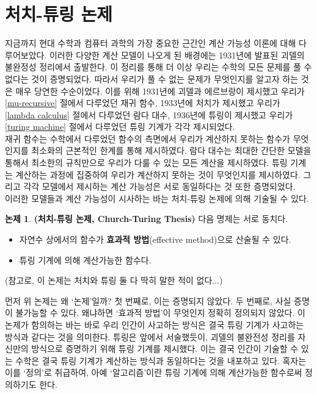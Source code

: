 \documentclass[b5paper, 10pt]{book}
\theoremstyle{definition}
\newtheorem{thesis}[defn]{논제}
\begin{document}
\section{처치-튜링 논제}
지금까지 현대 수학과 컴퓨터 과학의 가장 중요한 근간인 계산 가능성 이론에
대해 다루어보았다. 이러한 다양한 계산 모델이 나오게 된 배경에는 1931년에
발표된 괴델의 불완정성 정리에서 출발한다. 이 정리를 통해 더 이상 우리는 수학의 모든 문제를 풀 수 
없다는 것이 증명되었다. 따라서 우리가 풀 수 없는 문제가 무엇인지를 알고자 하는 것은 매우 당연한
수순이었다. 이를 위해 1931년에 괴델과 에르브랑이 제시했고 우리가 \ref{mu-recursive} 절에서 다루었던 재귀 함수, 
1933년에 처치가 제시했고 우리가 \ref{lambda calculus} 절에서 다루었던 람다 대수, 1936년에 튜링이 제시했고
우리가 \ref{turing machine} 절에서 다루었던 튜링 기계가 각각 제시되었다. \\
재귀 함수는 수학에서 다루었던 함수의 측면에서 우리가 계산하지 못하는 함수가 무엇인지를 최소화의 근본적인
한계를 통해 제시하였다. 람다 대수는 최대한 간단한 모델을 통해서 최소한의 규칙만으로 우리가 다룰 수 있는 
모든 계산을 제시하였다. 튜링 기계는 계산하는 과정에 집중하여 우리가 계산하지 못하는 것이 무엇인지를
제시하였다. 그리고 각각 모델에서 제시하는 계산 가능성은 서로 동일하다는 것 또한 증명되었다. \\
이러한 모델들과 계산 가능성이 시사하는 바는 처치-튜링 논제에 의해 기술될 수 있다.
\begin{thesis} 
    \textbf{(처치-튜링 논제, Church-Turing Thesis)} 다음 명제는 서로 동치다.
    \begin{itemize}
        \item 자연수 상에서의 함수가 \textbf{효과적 방법}(effective method)으로 산술될 수 있다.
        \item 튜링 기계에 의해 계산가능한 함수다.
    \end{itemize}
    (참고로, 이 논제는 처치와 튜링 둘 다 딱히 말한 적이 없다...)
\end{thesis}
먼저 위 논제는 왜 `논제'일까? 첫 번째로, 이는 증명되지 않았다. 두 번째로, 사실 증명이 불가능할 수 있다.
왜냐하면 `효과적 방법'이 무엇인지 정확히 정의되지 않았다. 이 논제가 함의하는 바는 바로 우리 인간이
사고하는 방식은 결국 튜링 기계가 사고하는 방식과 같다는 것을 의미한다. 튜링은 앞에서 서술했듯이,
괴델의 불완전성 정리를 자신만의 방식으로 증명하기 위해 튜링 기계를 제시했다. 이는 결국 인간이 기술할 수
있는 수학은 결국 튜링 기계가 계산하는 방식과 동일하다는 것을 내포하고 있다.  
혹자는 이를 `정의'로 취급하여, 아예 `알고리즘'이란 튜링 기계에 의해 계산가능한 함수로써 정의하기도 한다.
\end{document}
